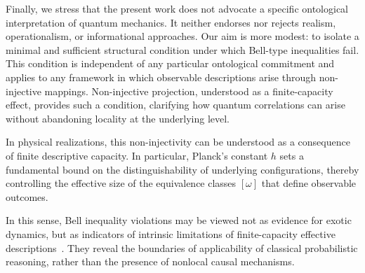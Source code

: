   Finally, we stress that the present work does not advocate a specific ontological
  interpretation of quantum mechanics.
  It neither endorses nor rejects realism, operationalism, or informational approaches.
  Our aim is more modest: to isolate a minimal and sufficient structural condition under
  which Bell-type inequalities fail.
  This condition is independent of any particular ontological commitment and applies
  to any framework in which observable descriptions arise through non-injective mappings.
  Non-injective projection, understood as a finite-capacity effect, provides such a
  condition, clarifying how quantum correlations can arise without abandoning locality
  at the underlying level.

  In physical realizations, this non-injectivity can be understood as a consequence
  of finite descriptive capacity.
  In particular, Planck's constant $h$ sets a fundamental bound on the
  distinguishability of underlying configurations, thereby controlling the effective
  size of the equivalence classes $[\omega]$ that define observable outcomes.

  In this sense, Bell inequality violations may be viewed not as evidence for exotic
  dynamics, but as indicators of intrinsic limitations of finite-capacity effective
  descriptions~\cite{Spekkens2007Epistemic}.
  They reveal the boundaries of applicability of classical probabilistic reasoning,
  rather than the presence of nonlocal causal mechanisms.

